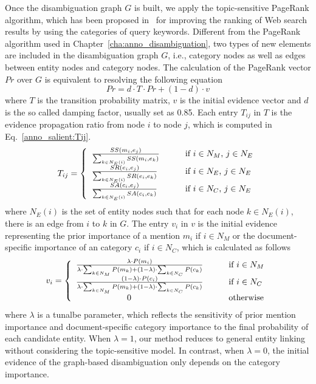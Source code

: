 Once the disambiguation graph $G$ is built, we apply the topic-sensitive PageRank algorithm, which has been proposed in~\cite{DBLP:conf/www/Haveliwala02,DBLP:journals/tkde/Haveliwala03} for improving the ranking of Web search results by using the categories of query keywords. Different from the PageRank algorithm used in Chapter~\ref{cha:anno_disambiguation}, two types of new elements are included in the disambiguation graph $G$, i.e., category nodes as well as edges between entity nodes and category nodes. The calculation of the PageRank vector $Pr$ over $G$ is equivalent to resolving the following equation
\begin{equation}\label{anno_salient:Pr}
Pr=d\cdot T\cdot Pr + (1-d)\cdot v
\end{equation}
where $T$ is the transition probability matrix, $v$ is the initial evidence vector and $d$ is the so called damping factor, usually set as 0.85. 
Each entry $T_{ij}$ in $T$ is the evidence propagation ratio from node $i$ to node $j$, which is computed in Eq.~\ref{anno_salient:Tij}. 
\begin{eqnarray}\label{anno_salient:Tij}
T_{ij}=\left\{ 
\begin{array}{ll}
\frac{SS(m_i,e_j)}{\sum_{k\in N_E(i)}SS(m_i,e_k)}  
&\text{\qquad if $i\in N_M$, $j\in N_E$}\\
\frac{SR(e_i,e_j)}{\sum_{k\in N_E(i)}SR(e_i,e_k)} 
&\text{\qquad if $i\in N_E$, $j\in N_E$}\\
\frac{SA(c_i,e_j)}{\sum_{k\in N_E(i)}SA(c_i,e_k)}  
&\text{\qquad if $i\in N_C$, $j\in N_E$}
\end{array} \right. 
\end{eqnarray}
where $N_E(i)$ is the set of entity nodes such that for each node $k\in N_E(i)$, there is an edge from $i$ to $k$ in $G$.
The entry $v_i$ in $v$ is the initial evidence representing the prior importance of a mention $m_i$ if $i\in N_M$ or the document-specific importance of an category $c_i$ if $i\in N_C$, which is calculated as follows
\begin{eqnarray}\label{anno_salient:vi}
v_i = \left\{ 
\begin{array}{ll}
\frac{\lambda\cdot  P(m_i)}{\lambda\cdot \sum_{k\in N_M}P(m_k)+(1-\lambda)\cdot \sum_{k\in N_C}P(c_k)}
&\text{\qquad if $i\in N_M$}\\
\frac{(1-\lambda)\cdot P(c_i)}{\lambda\cdot \sum_{k\in N_M}P(m_k)+(1-\lambda)\cdot \sum_{k\in N_C}P(c_k)} 
&\text{\qquad if $i\in N_C$}\\
\qquad\qquad\qquad 0 &\text{\qquad otherwise}
\end{array} \right. 
\end{eqnarray}
where $\lambda$ is a tunalbe parameter, which reflects the sensitivity of prior mention importance and document-specific category importance to the final probability of each candidate entity. When $\lambda = 1$, our method reduces to general entity linking without considering the topic-sensitive model. In contrast, when $\lambda = 0$, the initial evidence of the graph-based disambiguation only depends on the category importance. 


